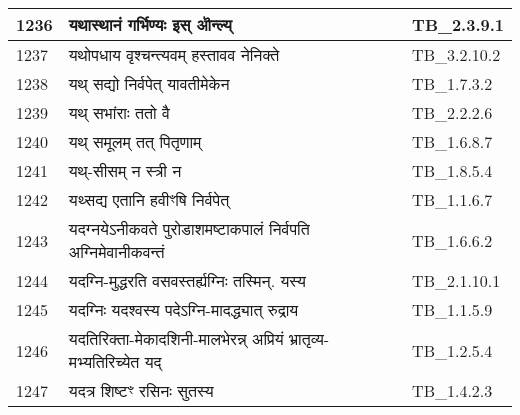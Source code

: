 \documentclass[17pt]{extarticle}
\begin{document}
\begin{longtable}{||p{0.4in}||p{4.9in}||p{0.9in}||}
    \hline
        
    1236 & यथास्थानं गर्भिण्यः इस् ऒन्ल्य् & TB\_2.3.9.1       \\
    
    \hline
        
    1237 & यथोपधाय वृश्चन्त्यवम् हस्तावव नेनिक्ते & TB\_3.2.10.2       \\
    
    \hline
        
    1238 & यथ् सद्यो निर्वपेत् यावतीमेकेन & TB\_1.7.3.2       \\
    
    \hline
        
    1239 & यथ् सभांराः ततो वै & TB\_2.2.2.6       \\
    
    \hline
        
    1240 & यथ् समूलम् तत् पितृणाम् & TB\_1.6.8.7       \\
    
    \hline
        
    1241 & यथ्{-}सीसम् न स्त्री न & TB\_1.8.5.4       \\
    
    \hline
        
    1242 & यथ्सद्य एतानि हवीꣳषि निर्वपेत् & TB\_1.1.6.7       \\
    
    \hline
        
    1243 & यदग्नयेऽनीकवते पुरोडाशमष्टाकपालं निर्वपति अग्निमेवानीकवन्तं & TB\_1.6.6.2       \\
    
    \hline
        
    1244 & यदग्नि{-}मुद्धरति वसवस्तर्ह्यग्निः तस्मिन्. यस्य & TB\_2.1.10.1       \\
    
    \hline
        
    1245 & यदग्निः यदश्वस्य पदेऽग्नि{-}मादद्ध्यात् रुद्राय & TB\_1.1.5.9       \\
    
    \hline
        
    1246 & यदतिरिक्ता{-}मेकादशिनी{-}मालभेरन्न् अप्रियं भ्रातृव्य{-}मभ्यतिरिच्येत यद् & TB\_1.2.5.4       \\
    
    \hline
        
    1247 & यदत्र शिष्टꣳ रसिनः सुतस्य & TB\_1.4.2.3       \\
    

\end{longtable}
\end{document}

